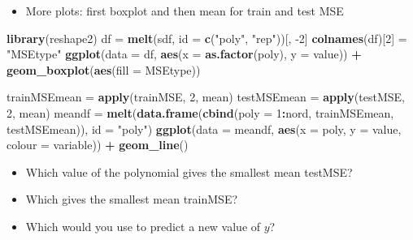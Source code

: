 \documentclass[]{article}
\newenvironment{Shaded}{\begin{snugshade}}{\end{snugshade}}
\newcommand{\KeywordTok}[1]{\textcolor[rgb]{0.13,0.29,0.53}{\textbf{#1}}}
\newcommand{\DataTypeTok}[1]{\textcolor[rgb]{0.13,0.29,0.53}{#1}}
\newcommand{\DecValTok}[1]{\textcolor[rgb]{0.00,0.00,0.81}{#1}}
\newcommand{\StringTok}[1]{\textcolor[rgb]{0.31,0.60,0.02}{#1}}
\newcommand{\OperatorTok}[1]{\textcolor[rgb]{0.81,0.36,0.00}{\textbf{#1}}}
\newcommand{\NormalTok}[1]{#1}
\providecommand{\tightlist}{%
  \setlength{\itemsep}{0pt}\setlength{\parskip}{0pt}}
\begin{document}
\begin{itemize}
\tightlist
\item
  More plots: first boxplot and then mean for train and test MSE
\end{itemize}

\begin{Shaded}
\begin{Highlighting}[]
\KeywordTok{library}\NormalTok{(reshape2)}
\NormalTok{df =}\StringTok{ }\KeywordTok{melt}\NormalTok{(sdf, }\DataTypeTok{id =} \KeywordTok{c}\NormalTok{(}\StringTok{"poly"}\NormalTok{, }\StringTok{"rep"}\NormalTok{))[, }\DecValTok{-2}\NormalTok{]}
\KeywordTok{colnames}\NormalTok{(df)[}\DecValTok{2}\NormalTok{] =}\StringTok{ "MSEtype"}
\KeywordTok{ggplot}\NormalTok{(}\DataTypeTok{data =}\NormalTok{ df, }\KeywordTok{aes}\NormalTok{(}\DataTypeTok{x =} \KeywordTok{as.factor}\NormalTok{(poly), }\DataTypeTok{y =}\NormalTok{ value)) }\OperatorTok{+}\StringTok{ }\KeywordTok{geom_boxplot}\NormalTok{(}\KeywordTok{aes}\NormalTok{(}\DataTypeTok{fill =}\NormalTok{ MSEtype))}
\end{Highlighting}
\end{Shaded}

\begin{Shaded}
\begin{Highlighting}[]
\NormalTok{trainMSEmean =}\StringTok{ }\KeywordTok{apply}\NormalTok{(trainMSE, }\DecValTok{2}\NormalTok{, mean)}
\NormalTok{testMSEmean =}\StringTok{ }\KeywordTok{apply}\NormalTok{(testMSE, }\DecValTok{2}\NormalTok{, mean)}
\NormalTok{meandf =}\StringTok{ }\KeywordTok{melt}\NormalTok{(}\KeywordTok{data.frame}\NormalTok{(}\KeywordTok{cbind}\NormalTok{(}\DataTypeTok{poly =} \DecValTok{1}\OperatorTok{:}\NormalTok{nord, trainMSEmean, testMSEmean)), }
    \DataTypeTok{id =} \StringTok{"poly"}\NormalTok{)}
\KeywordTok{ggplot}\NormalTok{(}\DataTypeTok{data =}\NormalTok{ meandf, }\KeywordTok{aes}\NormalTok{(}\DataTypeTok{x =}\NormalTok{ poly, }\DataTypeTok{y =}\NormalTok{ value, }\DataTypeTok{colour =}\NormalTok{ variable)) }\OperatorTok{+}\StringTok{ }
\StringTok{    }\KeywordTok{geom_line}\NormalTok{()}
\end{Highlighting}
\end{Shaded}

\begin{itemize}
\tightlist
\item
  Which value of the polynomial gives the smallest mean testMSE?
\item
  Which gives the smallest mean trainMSE?
\item
  Which would you use to predict a new value of \(y\)?
\end{itemize}
\end{document}
